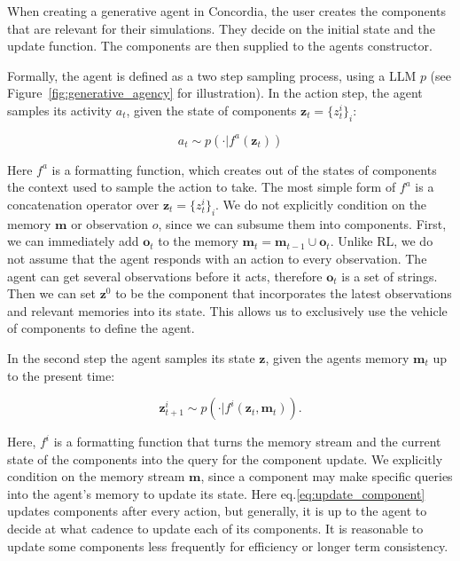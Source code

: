 \documentclass[11pt, a4paper, logo, twocolumn, internal, copyright, numbering]{googledeepmind}
\begin{document}
When creating a generative agent in Concordia, the user creates the components that are relevant for their simulations. They decide on the initial state and the update function. The components are then supplied to the agents constructor. 

Formally, the agent is defined as a two step sampling process, using a LLM $p$ (see Figure~\ref{fig:generative_agency} for illustration). In the action step, the agent samples its activity $a_t$, given the state of components $\mathbf{z}_t=\{z_t^i\}_i$:

\begin{equation}
    a_t \sim p (\cdot|f^a(\mathbf{z}_t))
    \label{eq:sample_action}
\end{equation}

Here $f^a$ is a formatting function, which creates out of the states of components the context used to sample the action to take. The most simple form of $f^a$ is a concatenation operator over $\mathbf{z}_t=\{z_t^i\}_i$. We do not explicitly condition on the memory $\mathbf{m}$ or observation $o$, since we can subsume them into components. First, we can immediately add $\mathbf{o}_t$ to the memory $\mathbf{m}_t = \mathbf{m}_{t-1} \cup \mathbf{o}_t$. Unlike RL, we do not assume that the agent responds with an action to every observation. The agent can get several observations before it acts, therefore $\mathbf{o}_t$ is a set of strings. 
Then we can set $\mathbf{z}^0$ to be the component that incorporates the latest observations and relevant memories into its state. This allows us to exclusively use the vehicle of components to define the agent.

In the second step the agent samples its state $\mathbf{z}$, given the agents memory $\mathbf{m}_t$ up to the present time: 

\begin{equation}
    \mathbf{z}^i_{t+1} \sim p(\cdot|f^i(\mathbf{z}_t, \mathbf{m}_t)).
    \label{eq:update_component}
\end{equation}

Here, $f^i$ is a formatting function that turns the memory stream and the current state of the components into the query for the component update. We explicitly condition on the memory stream $\mathbf{m}$, since a component may make specific queries into the agent's memory to update its state. Here eq.\ref{eq:update_component} updates components after every action, but generally, it is up to the agent to decide at what cadence to update each of its components. It is reasonable to update some components less frequently for efficiency or longer term consistency.
\end{document}
